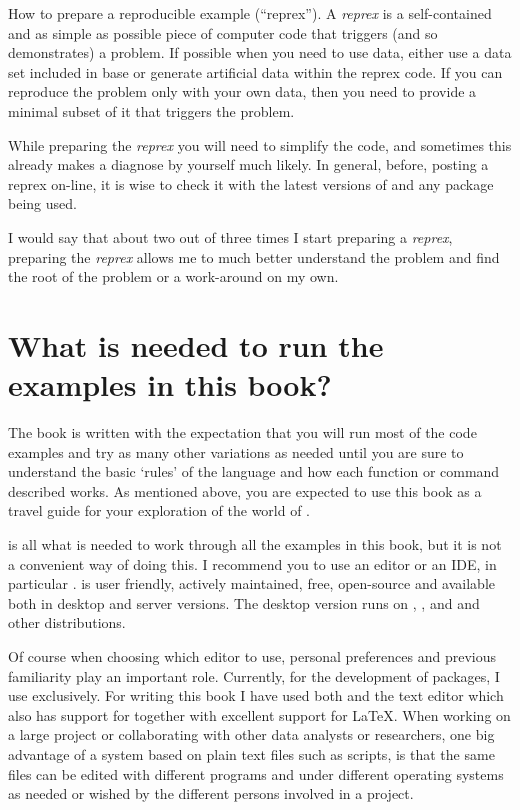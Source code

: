 \documentclass[krantz2]{krantz}\usepackage{knitr}%
\begin{document}
\begin{explainbox}
How to prepare a reproducible example (``reprex''). A \emph{reprex} is a self-contained and as simple as possible piece of computer code that triggers (and so demonstrates) a problem. If possible when you need to use data, either use a data set included in base \Rpgrm or generate artificial data within the reprex code. If you can reproduce the problem only with your own data, then you need to provide a minimal subset of it that triggers the problem.

While preparing the \emph{reprex} you will need to simplify the code, and sometimes this already makes a diagnose by yourself much likely. In general, before, posting a reprex on-line, it is wise to check it with the latest versions of \Rpgrm and any package being used.

I would say that about two out of three times I start preparing a \emph{reprex}, preparing the \emph{reprex} allows me to much better understand the problem and find the root of the problem or a work-around on my own.
\end{explainbox}

\section{What is needed to run the examples in this book?}

The book is written with the expectation that you will run most of the code examples and try as many other variations as needed until you are sure to understand the basic `rules' of the \Rpgrm language and how each function or command described works. As mentioned above, you are expected to use this book as a travel guide for your exploration of the world of \Rlang.

\Rpgrm is all what is needed to work through all the examples in this book, but it is not a convenient way of doing this. I recommend you to use an editor or an IDE, in particular \RStudio{}. \RStudio is user friendly, actively maintained, free, open-source and available both in desktop and server versions. The desktop version runs on , , and  and other  distributions.

Of course when choosing which editor to use, personal preferences and previous familiarity play an important role.
Currently, for the development of packages, I use \RStudio exclusively. For writing this book I have used both \RStudio and the text editor  which also has support for \Rpgrm together with excellent support for \LaTeX{}. When working on a large project or collaborating with other data analysts or researchers, one big advantage of a system based on plain text files such as \Rlang scripts, is that the same files can be edited with different programs and under different operating systems as needed or wished by the different persons involved in a project.
\end{document}
